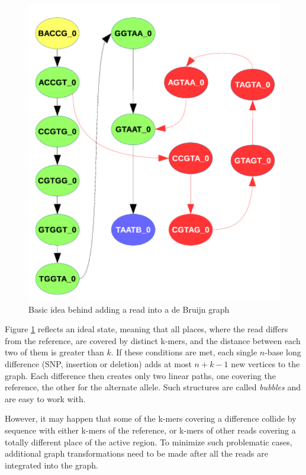 \begin{figure}[h]
	\centering
	\includegraphics{img/read-idea.pdf}
	\caption{Basic idea behind adding a read into a de Bruijn graph}
	\label{fig:read-idea}
\end{figure}

Figure \ref{fig:read-idea} reflects an ideal state, meaning that all places, where the read differs from the reference, are covered by distinct k-mers, and the distance between each two of them is greater than $k$. If these conditions are met, each single $n$-base long difference (SNP, insertion or deletion) adds at most $n+k-1$ new vertices to the graph. Each difference then creates only two linear paths, one covering the reference, the other for the alternate allele. Such structures are called \textit{bubbles} and are easy to work with.

However, it may happen that some of the k-mers covering a difference collide by sequence with either k-mers of the reference, or k-mers of other reads covering a totally different place of the active region. To minimize such problematic cases, additional graph transformations need to be made after all the reads are integrated into the graph.

